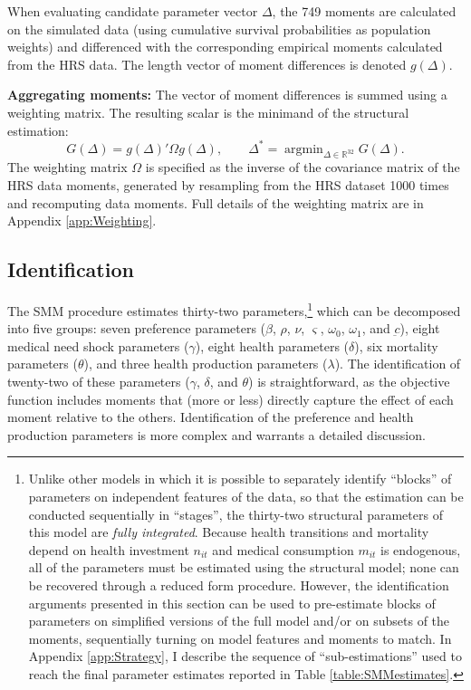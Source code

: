 \documentclass[12pt,pdftex,letterpaper]{article}
\DeclareMathOperator*{\argmin}{argmin}
\newcommand{\R}{\mathbb{R}}
\newcommand{\Con}{c}
\newcommand{\Care}{m}
\newcommand{\Invst}{n}
\newcommand{\MedShkParam}{\gamma}
\newcommand{\DiscFac}{\beta}
\newcommand{\ConFloor}{\underbar{\Con}}
\newcommand{\LifeUtility}{\varsigma}
\newcommand{\CRRAcon}{\rho}
\newcommand{\CRRAcare}{\nu}
\newcommand{\HealthParam}{\delta}
\newcommand{\MortParam}{\theta}
\newcommand{\BequestParam}{\omega}
\newcommand{\HealthProdParamAlt}{\lambda}
\begin{document}
When evaluating candidate parameter vector $\Delta$, the 749 moments are calculated on the simulated data (using cumulative survival probabilities as population weights) and differenced with the corresponding empirical moments calculated from the HRS data.  The length vector of moment differences is denoted $g(\Delta)$.

\vspace{0.5cm}

\noindent \textbf{Aggregating moments:} The vector of moment differences is summed using a weighting matrix.  The resulting scalar is the minimand of the structural estimation:
\begin{equation}
G(\Delta) = g(\Delta)' \Omega g(\Delta), \qquad \Delta^* = \argmin_{\Delta \in \R^{32}} G(\Delta).
\end{equation}
The weighting matrix $\Omega$ is specified as the inverse of the covariance matrix of the HRS data moments, generated by resampling from the HRS dataset 1000 times and recomputing data moments.  Full details of the weighting matrix are in Appendix \ref{app:Weighting}.


\subsection{Identification}
\label{sec:Ident}

The SMM procedure estimates thirty-two parameters,\footnote{Unlike other models in which it is possible to separately identify ``blocks'' of parameters on independent features of the data, so that the estimation can be conducted sequentially in ``stages'', the thirty-two structural parameters of this model are \textit{fully integrated}.  Because health transitions and mortality depend on health investment $\Invst_{it}$ and medical consumption $\Care_{it}$ is endogenous, all of the parameters must be estimated using the structural model; none can be recovered through a reduced form procedure.  However, the identification arguments presented in this section can be used to pre-estimate blocks of parameters on simplified versions of the full model and/or on subsets of the moments, sequentially turning on model features and moments to match.  In Appendix \ref{app:Strategy}, I describe the sequence of ``sub-estimations'' used to reach the final parameter estimates reported in Table \ref{table:SMMestimates}.} which can be decomposed into five groups: seven preference parameters ($\DiscFac$, $\CRRAcon$, $\CRRAcare$, $\LifeUtility$, $\BequestParam_0$, $\BequestParam_1$, and $\ConFloor$), eight medical need shock parameters ($\MedShkParam$), eight health parameters ($\HealthParam$), six mortality parameters ($\MortParam$), and three health production parameters ($\HealthProdParamAlt$).  The identification of twenty-two of these parameters ($\MedShkParam$, $\HealthParam$, and $\MortParam$) is straightforward, as the objective function includes moments that (more or less) directly capture the effect of each moment relative to the others.  Identification of the preference and health production parameters is more complex and warrants a detailed discussion.
\end{document}
